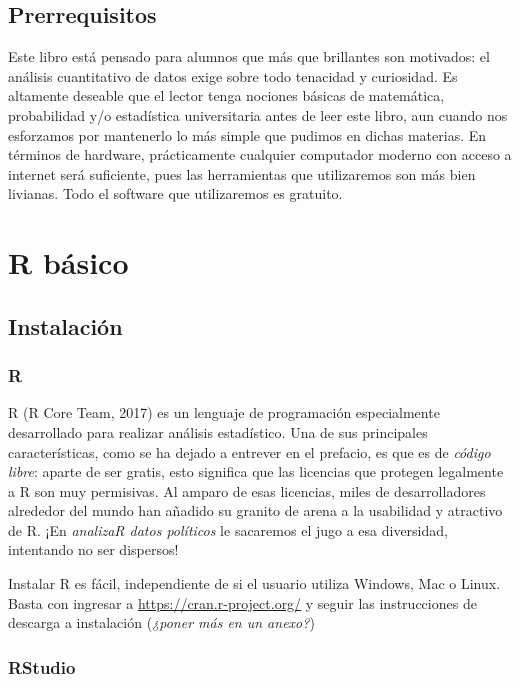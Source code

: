 \documentclass[]{book}
\begin{document}
\section{Prerrequisitos}\label{prerrequisitos}

Este libro está pensado para alumnos que más que brillantes son
motivados: el análisis cuantitativo de datos exige sobre todo tenacidad
y curiosidad. Es altamente deseable que el lector tenga nociones básicas
de matemática, probabilidad y/o estadística universitaria antes de leer
este libro, aun cuando nos esforzamos por mantenerlo lo más simple que
pudimos en dichas materias. En términos de hardware, prácticamente
cualquier computador moderno con acceso a internet será suficiente, pues
las herramientas que utilizaremos son más bien livianas. Todo el
software que utilizaremos es gratuito.

\chapter{R básico}\label{r-basico}

\section{Instalación}\label{instalacion}

\subsection{R}\label{r}

R (R Core Team, 2017) es un lenguaje de programación especialmente
desarrollado para realizar análisis estadístico. Una de sus principales
características, como se ha dejado a entrever en el prefacio, es que es
de \emph{código libre}: aparte de ser gratis, esto significa que las
licencias que protegen legalmente a R son muy permisivas. Al amparo de
esas licencias, miles de desarrolladores alrededor del mundo han añadido
su granito de arena a la usabilidad y atractivo de R. ¡En \emph{analizaR
datos políticos} le sacaremos el jugo a esa diversidad, intentando no
ser dispersos!

Instalar R es fácil, independiente de si el usuario utiliza Windows, Mac
o Linux. Basta con ingresar a \url{https://cran.r-project.org/} y seguir
las instrucciones de descarga a instalación (\emph{¿poner más en un
anexo?})

\subsection{RStudio}\label{rstudio}
\end{document}
